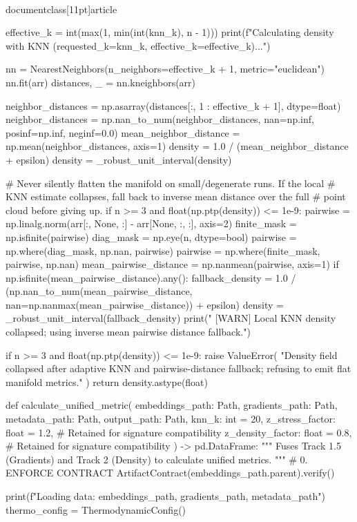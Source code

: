 \\documentclass[11pt]{article}
\begin{document}
\begin{CodeBlock}
    effective_k = int(max(1, min(int(knn_k), n - 1)))
    print(f"Calculating density with KNN (requested_k={knn_k}, effective_k={effective_k})...")

    nn = NearestNeighbors(n_neighbors=effective_k + 1, metric="euclidean")
    nn.fit(arr)
    distances, _ = nn.kneighbors(arr)

    neighbor_distances = np.asarray(distances[:, 1 : effective_k + 1], dtype=float)
    neighbor_distances = np.nan_to_num(neighbor_distances, nan=np.inf, posinf=np.inf, neginf=0.0)
    mean_neighbor_distance = np.mean(neighbor_distances, axis=1)
    density = 1.0 / (mean_neighbor_distance + epsilon)
    density = _robust_unit_interval(density)

    # Never silently flatten the manifold on small/degenerate runs. If the local
    # KNN estimate collapses, fall back to inverse mean distance over the full
    # point cloud before giving up.
    if n >= 3 and float(np.ptp(density)) <= 1e-9:
        pairwise = np.linalg.norm(arr[:, None, :] - arr[None, :, :], axis=2)
        finite_mask = np.isfinite(pairwise)
        diag_mask = np.eye(n, dtype=bool)
        pairwise = np.where(diag_mask, np.nan, pairwise)
        pairwise = np.where(finite_mask, pairwise, np.nan)
        mean_pairwise_distance = np.nanmean(pairwise, axis=1)
        if np.isfinite(mean_pairwise_distance).any():
            fallback_density = 1.0 / (np.nan_to_num(mean_pairwise_distance, nan=np.nanmax(mean_pairwise_distance)) + epsilon)
            density = _robust_unit_interval(fallback_density)
            print("  [WARN] Local KNN density collapsed; using inverse mean pairwise distance fallback.")

    if n >= 3 and float(np.ptp(density)) <= 1e-9:
        raise ValueError(
            "Density field collapsed after adaptive KNN and pairwise-distance fallback; refusing to emit flat manifold metrics."
        )
    return density.astype(float)


def calculate_unified_metric(
    embeddings_path: Path,
    gradients_path: Path,
    metadata_path: Path,
    output_path: Path,
    knn_k: int = 20,
    z_stress_factor: float = 1.2, # Retained for signature compatibility
    z_density_factor: float = 0.8, # Retained for signature compatibility
) -> pd.DataFrame:
    """
    Fuses Track 1.5 (Gradients) and Track 2 (Density) to calculate unified metrics.
    """
    # 0. ENFORCE CONTRACT
    ArtifactContract(embeddings_path.parent).verify()

    print(f"Loading data: {embeddings_path}, {gradients_path}, {metadata_path}")
    thermo_config = ThermodynamicConfig()


\end{CodeBlock}
\end{document}

